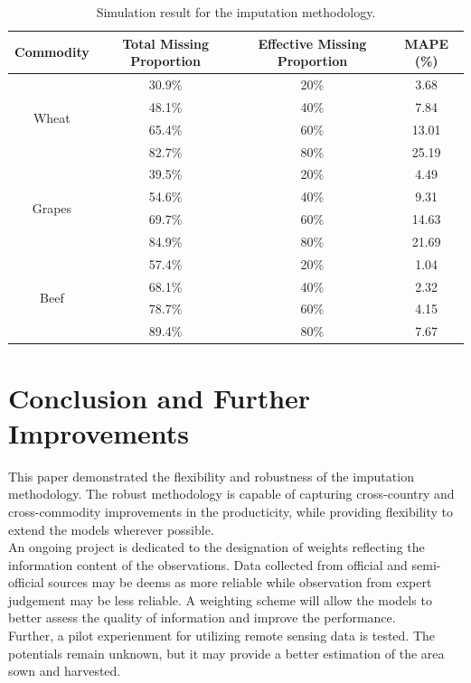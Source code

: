 \documentclass[nojss]{jss}\usepackage[]{graphicx}\usepackage[]{color}
\begin{document}
\begin{table}
  \centering
  \label{tab:simResult}
  \caption{Simulation result for the imputation methodology.}  
  \begin{tabular}{|c|c|c|c|}
    \hline
    Commodity & Total Missing Proportion & Effective Missing Proportion & MAPE (\%)\\
    \hline \hline
    \multirow{4}{*}{Wheat}
      & 30.9\%  & 20\% & 3.68\\
      & 48.1\%  & 40\% & 7.84\\
      & 65.4\%  & 60\% & 13.01\\
      & 82.7\%  & 80\% & 25.19\\
    \hline
    \multirow{4}{*}{Grapes}
      & 39.5\%  & 20\% & 4.49\\
      & 54.6\%  & 40\% & 9.31\\
      & 69.7\%  & 60\% & 14.63\\
      & 84.9\%  & 80\% & 21.69\\
    \hline
    \multirow{4}{*}{Beef}
      & 57.4\%  & 20\% & 1.04\\
      & 68.1\%  & 40\% & 2.32\\
      & 78.7\%  & 60\% & 4.15\\
      & 89.4\%  & 80\% & 7.67\\
    \hline 
  \end{tabular}
\end{table}


\FloatBarrier
\section{Conclusion and Further Improvements}
This paper demonstrated the flexibility and robustness of the
imputation methodology. The robust methodology is capable of capturing
cross-country and cross-commodity improvements in the producticity,
while providing flexibility to extend the models wherever possible.\\

An ongoing project is dedicated to the designation of weights
reflecting the information content of the observations. Data collected
from official and semi-official sources may be deems as more reliable
while observation from expert judgement may be less reliable. A
weighting scheme will allow the models to better assess the quality of
information and improve the performance.\\

Further, a pilot experienment for utilizing remote sensing data is
tested. The potentials remain unknown, but it may provide a better
estimation of the area sown and harvested.\\
\end{document}

